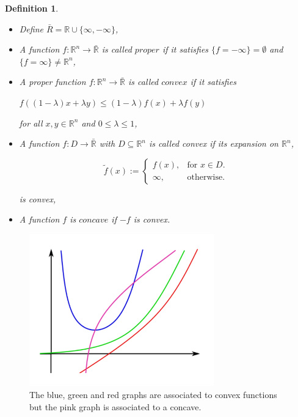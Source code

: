 \documentclass[a4paper]{book}
\newtheorem{definition}[theorem]{Definition}%
\numberwithin{theorem}{section}%
\begin{document}
\begin{definition}
	\begin{itemize}
		\item Define $\bar{R}=\mathbb{R}\cup\{ \infty,-\infty\}$,
		\item A function $f:\mathbb{R}^n\to\bar{\mathbb{R}}$ is called $proper$ if it satisfies $\{f=-\infty\}=\emptyset$ and $\{f=\infty\}\neq\mathbb{R}^n$,
		\item A proper function $f:\mathbb{R}^n\to\bar{\mathbb{R}}$ is called $convex$ if it satisfies 
		\begin{center}
			$\displaystyle f((1-\lambda)x+\lambda y)\leq(1-\lambda)f(x)+\lambda f(y)$
		\end{center}
		for all $x, y\in\mathbb{R}^n$ and $0\leq\lambda\leq1$,
		\item A function $f:D\to\bar{\mathbb{R}}$ with $D\subseteq\mathbb{R}^n$ is called convex if its expansion on $\mathbb{R}^n$,
		\begin{center}
			\begin{equation*}
				  \tilde{f}(x):=\begin{cases}
				    	f(x), & \text{for $x\in D$}.\\
				   	 \infty, & \text{otherwise}.
				  \end{cases}
			\end{equation*}
		\end{center}
		is convex,
		\item A function $f$ is $concave$ if $-f$ is convex.
	\end{itemize}
\end{definition}
\begin{figure}[h]
    \begin{center}   
        \includegraphics[width=80mm]{ConcaveFunction}
        \caption{The blue, green and red graphs are associated to convex functions but the pink graph is associated to a concave.}
    \end{center}
\end{figure}
\end{document}
